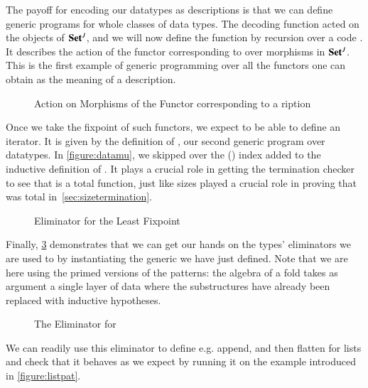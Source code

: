 The payoff for encoding our datatypes as descriptions is that we can
define generic programs for whole classes of data types. The decoding
function  acted on the objects of ${\mathbf{Set}}{}^J$, and we will now
define the function  by recursion over a code .
It describes the action of the functor corresponding to  over
morphisms in ${\mathbf{Set}}{}^J$. This is the first example of generic
programming over all the functors one can obtain as the meaning
of a description.

\begin{figure}[h]
\caption{Action on Morphisms of the Functor corresponding to a ription\label{fig:fmapD}}
\end{figure}

Once we take the fixpoint of such functors, we expect to be able to define
an iterator. It is given by the definition of  , our second
generic program over datatypes. In \cref{figure:datamu}, we skipped over
the  (\cite{DBLP:journals/corr/abs-1012-4896}) index added to the
inductive definition of . It plays a crucial role in getting the
termination checker to see that  is a total function, just like
sizes played a crucial role in proving that 
was total in~\cref{sec:sizetermination}.

\begin{figure}[h]
\caption{Eliminator for the Least Fixpoint}\label{figure:datafold}
\end{figure}

Finally, \cref{fig:listfold} demonstrates that we can get our hands
on the types' eliminators we are used to by instantiating the generic
 we have just defined. Note that we are here using the primed
versions of the patterns: the algebra of a fold takes as argument a
single layer of data where the substructures have already been replaced
with inductive hypotheses.

\begin{figure}
  \caption{The Eliminator for \label{fig:listfold}}
\end{figure}

We can readily use this eliminator to define e.g. append, and then
flatten for lists and check that it behaves as we expect by running
it on the example introduced in \cref{figure:listpat}.

